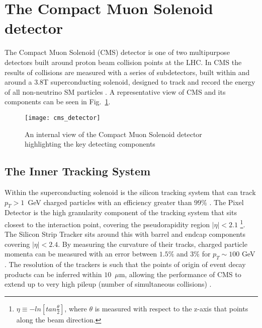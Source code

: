 
\section{The Compact Muon Solenoid detector}
\label{sec:CMS}

The Compact Muon Solenoid (CMS) detector is one of two multipurpose detectors built around proton beam collision points at the LHC. In CMS the results of collisions are measured with a series of subdetectors, built within and around a 3.8T superconducting solenoid, designed to track and record the energy of all non-neutrino SM particles \cite{CMSTechDesign1DetectorPerformance}. A representative view of CMS and its components can be seen in Fig.~\ref{fig:CMS}.
\begin{figure}
	\begin{center}
		\texttt{[image: cms\_detector]}
	\end{center}
	\caption{An internal view of the Compact Muon Solenoid detector highlighting the key detecting components \cite{CMSTechDesign1DetectorPerformance}}
	\label{fig:CMS}
\end{figure}

\subsection{The Inner Tracking System}
Within the superconducting solenoid is the silicon tracking system that can track \mbox{$p_T>1$~GeV} charged particles with an efficiency greater than $99\%$ \cite{ScienceArticle} \cite{CMSTechDesign1DetectorPerformance}. The Pixel Detector is the high granularity component of the tracking system that sits closest to the interaction point, covering the pseudorapidity region $|\eta|<2.1$ \footnote{$\eta \equiv -ln[tan\frac{\theta}{2}]$, where $\theta$ is measured with respect to the z-axis that points along the beam direction.}. The Silicon Strip Tracker sits around this with barrel and endcap components covering $|\eta|<2.4$. By measuring the curvature of their tracks, charged particle momenta can be measured with an error between $1.5\%$ and $3\%$ for $p_T\sim 100$ GeV \cite{Adam_Elwood_MSci}. The resolution of the trackers is such that the points of origin of event decay products can be inferred within $10$~$\mu$m, allowing the performance of CMS to extend up to very high pileup (number of simultaneous collisions) \cite{CMSTrackPerformance}.

